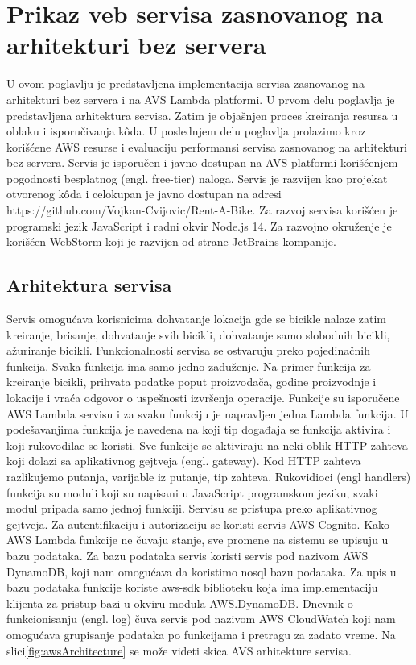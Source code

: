 \documentclass[12pt,oneside]{memoir}
\begin{document}
\chapter{Prikaz veb servisa zasnovanog na arhitekturi bez servera}
 
U ovom poglavlju je predstavljena implementacija servisa zasnovanog na arhitekturi bez servera i na AVS Lambda platformi. U prvom delu poglavlja je predstavljena arhitektura servisa. Zatim je objašnjen proces kreiranja resursa u oblaku i isporučivanja kôda. U poslednjem delu poglavlja prolazimo kroz korišćene AWS resurse i evaluaciju performansi servisa zasnovanog na arhitekturi bez servera. Servis je isporučen i javno dostupan na AVS platformi korišćenjem pogodnosti besplatnog (engl. free-tier) naloga. Servis je razvijen kao projekat otvorenog kôda i celokupan je javno dostupan na adresi https://github.com/Vojkan-Cvijovic/Rent-A-Bike. Za razvoj servisa korišćen je programski jezik JavaScript i radni okvir Node.js 14. Za razvojno okruženje je korišćen WebStorm koji je razvijen od strane JetBrains kompanije.
\section{Arhitektura servisa}
Servis omogućava korisnicima dohvatanje lokacija gde se bicikle nalaze zatim kreiranje, brisanje, dohvatanje svih bicikli, dohvatanje samo slobodnih bicikli, ažuriranje bicikli. Funkcionalnosti servisa se ostvaruju preko pojedinačnih funkcija. Svaka funkcija ima samo jedno zaduženje. Na primer funkcija za kreiranje bicikli, prihvata podatke poput proizvođača, godine proizvodnje i lokacije i vraća odgovor o uspešnosti izvršenja operacije. Funkcije su isporučene AWS Lambda servisu i za svaku funkciju je napravljen jedna Lambda funkcija. U podešavanjima funkcija je navedena na koji tip događaja se funkcija aktivira i koji rukovodilac se koristi. Sve funkcije se aktiviraju na neki oblik HTTP zahteva koji dolazi sa aplikativnog gejtveja (engl. gateway). Kod HTTP zahteva razlikujemo putanja, varijable iz putanje, tip zahteva. Rukovidioci (engl handlers) funkcija su moduli koji su napisani u JavaScript programskom jeziku, svaki modul pripada samo jednoj funkciji. Servisu se pristupa preko aplikativnog gejtveja. Za autentifikaciju i autorizaciju se koristi servis AWS Cognito. Kako AWS Lambda funkcije ne čuvaju stanje, sve promene na sistemu se upisuju u bazu podataka. Za bazu podataka servis koristi servis pod nazivom AWS DynamoDB, koji nam omogućava da koristimo nosql bazu podataka. Za upis u bazu podataka funkcije koriste aws-sdk biblioteku koja ima implementaciju klijenta za pristup bazi u okviru modula AWS.DynamoDB. Dnevnik o funkcionisanju (engl. log) čuva servis pod nazivom AWS CloudWatch koji nam omogućava grupisanje podataka po funkcijama i pretragu za zadato vreme. Na slici\ref{fig:awsArchitecture} se može videti skica AVS arhitekture servisa.
\end{document}
